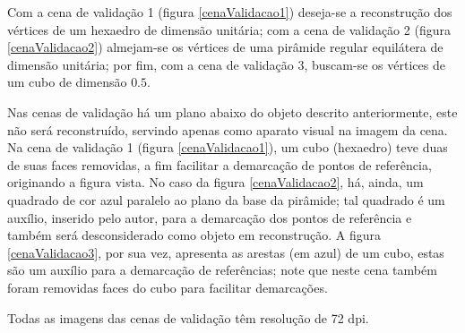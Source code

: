 	Com a cena de validação 1 (figura \ref{cenaValidacao1}) deseja-se a reconstrução dos vértices de um hexaedro de dimensão unitária; com a cena de validação 2 (figura \ref{cenaValidacao2}) almejam-se os vértices de uma pirâmide regular equilátera de dimensão unitária; por fim, com a cena de validação 3, buscam-se os vértices de um cubo de dimensão $0.5$. 
	
	Nas cenas de validação há um plano abaixo do objeto descrito anteriormente, este não será reconstruído, servindo apenas como aparato visual na imagem da cena. Na cena de validação 1 (figura \ref{cenaValidacao1}), um cubo (hexaedro) teve duas de suas faces removidas, a fim facilitar a demarcação de pontos de referência, originando a figura vista. No caso da figura \ref{cenaValidacao2}, há, ainda, um quadrado de cor azul paralelo ao plano da base da pirâmide; tal quadrado é um auxílio, inserido pelo autor, para a demarcação dos pontos de referência e também será desconsiderado como objeto em reconstrução. A figura \ref{cenaValidacao3}, por sua vez, apresenta as arestas (em azul) de um cubo, estas são um auxílio para a demarcação de referências; note que neste cena também foram removidas faces do cubo para facilitar demarcações.

	Todas as imagens das cenas de validação têm resolução de 72 dpi.
